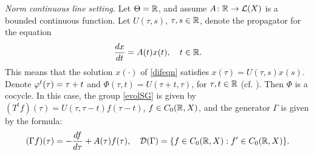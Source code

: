 \begin{exmp} {\it Norm continuous line setting.}
Let $\Theta={\Bbb{R}}$, and assume $A\colon{\Bbb{R}}\to {\cal{L}}(X)$ is a bounded
continuous function. Let $U(\tau,s)$, $\tau,s\in{\Bbb{R}}$, denote the
propagator for the equation
\begin{equation}\label{difeqn}
\dfrac{dx}{dt}=A(t)x(t),
\quad t\in{\Bbb{R}}.
\end{equation}
This means that the solution $x(\cdot)$ of \eqref{difeqn}
satisfies $x(\tau)=U(\tau,s)x(s)$.
Denote $\varphi^t(\tau)=\tau+t$ and $\Phi(\tau,t)=U(\tau+t,\tau)$,
for $\tau,t\in{\Bbb{R}}$ (cf. \cite{ChLe3}). Then
$\Phi$ is a cocycle. In this case, the group
\eqref{evolSG} is given by $(T^tf)(\tau)=U(\tau,\tau-t)f(\tau-t)$,
$f\in C_0({\Bbb{R}},X)$, and the generator $\Gamma$ is given by the formula:
\[(\Gamma f)(\tau)=-\dfrac{df}{d\tau}+A(\tau)f(\tau),
\quad {\cal{D}}(\Gamma)=\{f\in C_0({\Bbb{R}},X): f'\in C_0({\Bbb{R}},X)\}.\]
\end{exmp}

